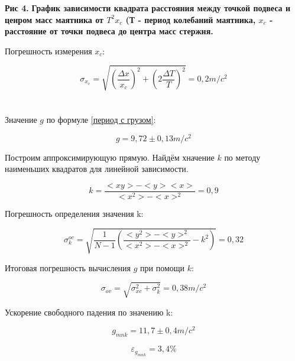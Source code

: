 \begin{flushright}
{\scriptsize \textbf{Рис 4.} \textbf {График зависимости квадрата расстояния между точкой подвеса и ценром масс маятника от $T^2x_c$ (Т - период колебаний маятника, $x_c$ - расстояние от точки подвеса до центра масс стержня.}}
\end{flushright}

    Погрешность измерения $x_c$:
    
\[\sigma_{x_c} = \sqrt{\left(\frac{\Delta x}{x_c}\right)^2 + \left(2\frac{\Delta T}{T}\right)^2} = 0,2 m/c^2\]\\\\

    Значение $g$ по формуле \eqref{период с грузом}:
    
\[g = 9,72 \pm 0,13 m/c^2\]


    Построим аппроксимирующую прямую. Найдём хначение $k$ по методу наименьших квадратов для линейной зависимости.
    
\[k = \frac{<xy> - <y><x>}{<x^2> - <x>^2} = 0,9\]    
    
    Погрешность определения значения k:
    
\[\sigma_{k}^{oc} = \sqrt{\frac{1}{N-1} \left(\frac{<y^2> - <y>^2}{<x^2> - <x>^2} - k^2\right)} = 0,32\]


    Итоговая погрешность вычисления $g$ при помощи $k$:
    
\[\sigma_{ov} = \sqrt{\sigma_{xc}^2 + \sigma_k^2} =  0,38 m/c^2\]


    Ускорение свободного падения по значению k:
    
\[g_{mnk} = 11,7 \pm  0,4 m/c^2\]

\[\varepsilon_{g_{mnk}} = 3,4\%\]



\newpage
